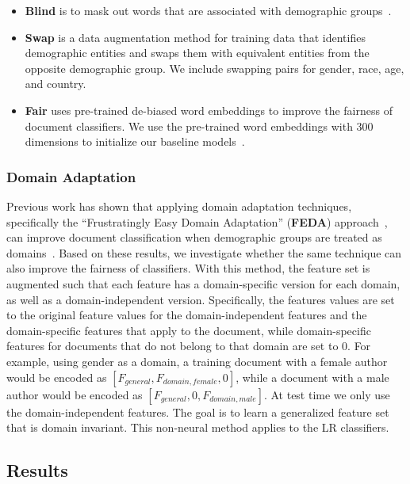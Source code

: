 \begin{itemize}
    \item \textbf{Blind} is to mask out words that are associated with demographic groups~\cite{garg2019counterfactual}.
    \item \textbf{Swap} is a data augmentation method for training data that identifies demographic entities and swaps them with equivalent entities from the opposite demographic group. We include swapping pairs for gender, race, age, and country.
    \item \textbf{Fair} uses pre-trained de-biased word embeddings to improve the fairness of document classifiers. 
We use the pre-trained word embeddings with 300 dimensions to initialize our baseline models~\cite{bolukbasi2016man}.
\end{itemize}


\subsubsection{Domain Adaptation}

Previous work has shown that applying domain adaptation techniques, specifically the ``Frustratingly Easy Domain Adaptation'' (\textbf{FEDA}) approach~\cite{daume2007frustratingly},
can improve document classification when demographic groups are treated as domains~\cite{volkova2013exploring, lynn2017human}.
Based on these results, we investigate whether the same technique can also improve the fairness of classifiers.
With this method, the feature set is augmented such that each feature has a domain-specific version for each domain, as well as a domain-independent version.
Specifically, the features values are set to the original feature values for the domain-independent features and the domain-specific features that apply to the document, while domain-specific features for documents that do not belong to that domain are set to $0$.
For example, using gender as a domain, a training document with a female author would be encoded as $[F_{general}, F_{domain, female}, 0]$, while a document with a male author would be encoded as $[F_{general}, 0, F_{domain, male}]$.
At test time we only use the domain-independent features.
The goal is to learn a generalized feature set that is domain invariant.
This non-neural method applies to the LR classifiers.


\subsection{Results}

